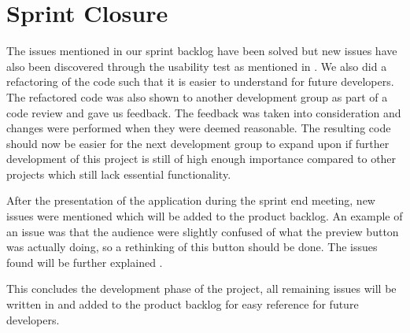 
\section{Sprint Closure}
The issues mentioned in our sprint backlog have been solved but new issues have also been discovered through the usability test as mentioned in . 
We also did a refactoring of the code such that it is easier to understand for future developers.
The refactored code was also shown to another development group as part of a code review and gave us feedback.
The feedback was taken into consideration and changes were performed when they were deemed reasonable.
The resulting code should now be easier for the next development group to expand upon if further development of this project is still of high enough importance compared to other projects which still lack essential functionality.

After the presentation of the application during the sprint end meeting, new issues were mentioned which will be added to the product backlog.
An example of an issue was that the audience were slightly confused of what the preview button was actually doing, so a rethinking of this button should be done.
The issues found will be further explained \secref{}.

This concludes the development phase of the project, all remaining issues will be written in \secref{} and added to the product backlog for easy reference for future developers.